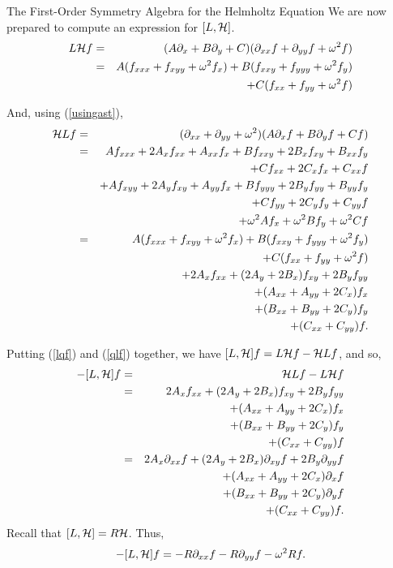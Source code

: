 \begin{section}{The First-Order Symmetry Algebra for the Helmholtz Equation}
We are now prepared to compute an expression for $[L, \mathcal{H}]$.
\begin{eqnarray}
\label{lqf}
L \mathcal{H} f	& = & (A \partial_{x} + B \partial_{y} + C) (\partial_{x x} f + \partial_{y y} f + \omega^2 f) \nonumber\\
	& = & A (f_{xxx} + f_{xyy} + \omega^2 f_x) + B (f_{xxy} + f_{yyy} + \omega^2 f_y) \nonumber\\
	&   & + C (f_{xx} + f_{yy} + \omega^2 f)
\end{eqnarray}

And, using (\ref{usingast}),
\begin{eqnarray}
\label{qlf}
\mathcal{H} L f  	& = & (\partial_{x x} + \partial_{y y} + \omega^2) (A \partial_{x} f + B \partial_{y} f + C f) \nonumber\\
	& = & A f_{xxx} + 2 A_x f_{xx} + A_{xx} f_x + B f_{xxy} + 2 B_x f_{xy} + B_{xx} f_y \nonumber\\
	&   & + C f_{xx} + 2 C_x f_x + C_{xx} f \nonumber\\
	&   & + A f_{xyy} + 2 A_y f_{xy} + A_{yy} f_x + B f_{yyy} + 2 B_y f_{yy} + B_{yy} f_y \nonumber\\
	&   & + C f_{yy} + 2 C_y f_y + C_{yy} f \nonumber\\
	&   & + \omega^2 A f_x + \omega^2 B f_y + \omega^2 C f \nonumber\\
	& = & A (f_{xxx} + f_{xyy} + \omega^2 f_x) + B (f_{xxy} + f_{yyy} + \omega^2 f_y) \nonumber\\
	&   & + C (f_{xx} + f_{yy} + \omega^2 f) \nonumber\\
	&   & + 2 A_x f_{xx} + (2 A_y + 2 B_x) f_{xy} + 2 B_y f_{yy} \nonumber\\
	&   & + (A_{xx} + A_{yy} + 2 C_x) f_x \nonumber\\
	&   & + (B_{xx} + B_{yy} + 2 C_y) f_y \nonumber\\
	&   & + (C_{xx} + C_{yy}) f.
\end{eqnarray}

Putting (\ref{lqf}) and (\ref{qlf}) together, we have $[L, \mathcal{H}]f =  L \mathcal{H} f - \mathcal{H} L f$, and so,
\begin{eqnarray*}
-[L,\mathcal{H}]f & = & \mathcal{H} L f - L \mathcal{H} f \\
	& = & 2 A_x f_{xx} + (2 A_y + 2 B_x) f_{xy} + 2 B_y f_{yy} \\
	&   & + (A_{xx} + A_{yy} + 2 C_x) f_x \\
	&   & + (B_{xx} + B_{yy} + 2 C_y) f_y \\
	&   & + (C_{xx} + C_{yy}) f \\
	& = & 2 A_x \partial_{x x} f + (2 A_y + 2 B_x) \partial_{x y} f + 2 B_y \partial_{y y} f \\
	&   & + (A_{xx} + A_{yy} + 2 C_x) \partial_{x} f \\
	&   & + (B_{xx} + B_{yy} + 2 C_y) \partial_{y} f \\
	&   & + (C_{xx} + C_{yy}) f.
\end{eqnarray*}
Recall that $[L,\mathcal{H}] = R\mathcal{H}$.  Thus,
\[
-[L,\mathcal{H}]f = -R \partial_{x x} f - R \partial_{y y} f - \omega^2 R f.
\]


\end{section}
